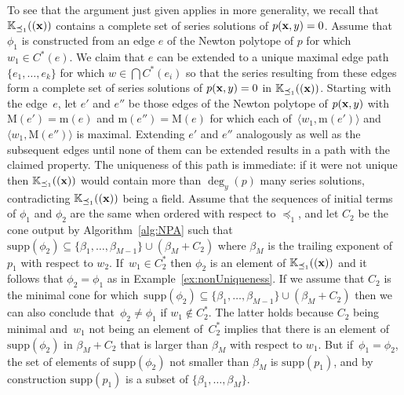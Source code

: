 \documentclass[a4paper,draft]{amsart}
\theoremstyle{definition}
\begin{document}
To see that the argument just given applies in more generality, we recall that $\mathbb{K}_{\preceq_1}((\bold{x}))$ contains a complete set of series solutions of $p(\bold{x},y)=0$. Assume that $\phi_1$ is constructed from an edge $e$ of the Newton polytope of $p$ for which $w_1\in C^*(e)$. We claim that $e$ can be extended to a unique maximal edge path $\{e_1,\dots,e_k\}$ for which $w\in \bigcap C^*(e_i)$ so that the series resulting from these edges form a complete set of series solutions of $p(\bold{x},y)=0$ in $\mathbb{K}_{\preceq_1}((\bold{x}))$. Starting with the edge~$e$, let $e'$ and $e''$ be those edges of the Newton polytope of $p(\bold{x},y)$ with $\mathrm{M}(e') = \mathrm{m}(e)$ and $\mathrm{m}(e'') = \mathrm{M}(e)$ for which each of~$\langle w_1, \mathrm{m}(e') \rangle$ and~$\langle w_1, \mathrm{M}(e'') \rangle$ is maximal. Extending $e'$ and $e''$ analogously as well as the subsequent edges until none of them can be extended results in a path with the claimed property. The uniqueness of this path is immediate: if it were not unique then $\mathbb{K}_{\preceq_1}((\bold{x}))$ would contain more than $\deg_y(p)$ many series solutions, contradicting $\mathbb{K}_{\preceq_1}((\bold{x}))$ being a field. Assume that the sequences of initial terms of $\phi_1$ and $\phi_2$ are the same when ordered with respect to $\preceq_1$, and let $C_2$ be the cone output by Algorithm~\ref{alg:NPA} such that $\mathrm{supp}(\phi_2)\subseteq\{\beta_1,\dots,\beta_{M-1}\}\cup \left( \beta_M + C_2 \right)$ where $\beta_M$ is the trailing exponent of~$p_1$ with respect to $w_2$. If~$w_1\in C_2^*$ then $\phi_2$ is an element of $\mathbb{K}_{\preceq_1}((\bold{x}))$ and it follows that $\phi_2=\phi_1$ as in Example~\ref{ex:nonUniqueness}. If we assume that $C_2$ is the minimal cone for which~$\mathrm{supp}(\phi_2)\subseteq\{\beta_1,\dots,\beta_{M-1}\}\cup \left( \beta_M + C_2 \right)$ then we can also conclude that~$\phi_2\neq \phi_1$ if $w_1\notin C_2^*$. The latter holds because $C_2$ being minimal and~$w_1$ not being an element of~$C_2^*$ implies that there is an element of $\mathrm{supp}(\phi_2)$ in $\beta_M + C_2$ that is larger than $\beta_M$ with respect to $w_1$. But if~$\phi_1=\phi_2$, the set of elements of $\mathrm{supp}(\phi_2)$ not smaller than $\beta_M$ is $\mathrm{supp}(p_1)$, and by construction $\mathrm{supp}(p_1)$ is a subset of $\{\beta_1,\dots,\beta_M\}$. \\


\end{document}
